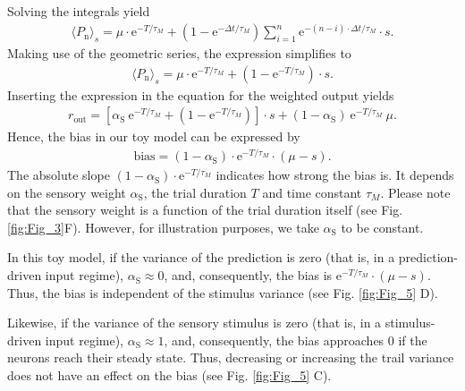 \documentclass[10pt,a4paper]{article}
\begin{document}
%
Solving the integrals yield
%
\begin{align}
\langle P_\mathrm{n} \rangle_s = \mu \cdot \mathrm{e}^{-T/\tau_M} + \left( 1 -   \mathrm{e}^{-\Delta t/\tau_M} \right) \sum_{i=1}^{n} \mathrm{e}^{-(n-i)\cdot \Delta t/ \tau_M} \cdot s.
\end{align}
%
Making use of the geometric series, the expression simplifies to
%
\begin{align*}
\langle P_\mathrm{n} \rangle_s =  \mu \cdot \mathrm{e}^{-T/\tau_M} + \left( 1 -   \mathrm{e}^{-T/\tau_M} \right) \cdot s.
\end{align*}
%
Inserting the expression in the equation for the weighted output yields
%
\begin{align*}
 r_\mathrm{out} = \left[ \alpha_\mathrm{S}\  \mathrm{e}^{-T/\tau_M} + \left( 1 -   \mathrm{e}^{-T/\tau_M} \right)\right] \cdot s + \left( 1 -\alpha_\mathrm{S} \right)\ \mathrm{e}^{-T/\tau_M}\ \mu.
\end{align*}
%
Hence, the bias in our toy model can be expressed by
%
\begin{align*}
 \mathrm{bias} = \left( 1 -\alpha_\mathrm{S} \right)\cdot \mathrm{e}^{-T/\tau_M}\cdot \left(\mu - s \right).
\end{align*}
%
The absolute slope $\left( 1 -\alpha_\mathrm{S} \right)\cdot \mathrm{e}^{-T/\tau_M}$ indicates how strong the bias is. It depends on the sensory weight $\alpha_\mathrm{S}$, the trial duration $T$ and time constant $\tau_M$. Please note that the sensory weight is a function of the trial duration itself (see Fig. \ref{fig:Fig_3}F). However, for illustration purposes, we take $\alpha_\mathrm{S}$ to be constant.
 
In this toy model, if the variance of the prediction is zero (that is, in a prediction-driven input regime), $\alpha_\mathrm{S} \approx 0$, and, consequently, the bias is $\mathrm{e}^{-T/\tau_M}\cdot \left(\mu - s \right)$. Thus, the bias is independent of the stimulus variance (see Fig. \ref{fig:Fig_5} D).

Likewise, if the variance of the sensory stimulus is zero (that is, in a stimulus-driven input regime), $\alpha_\mathrm{S} \approx 1$, and, consequently, the bias approaches $0$ if the neurons reach their steady state. Thus, decreasing or increasing the trail variance does not have an effect on the bias (see Fig. \ref{fig:Fig_5} C).

\end{document}
